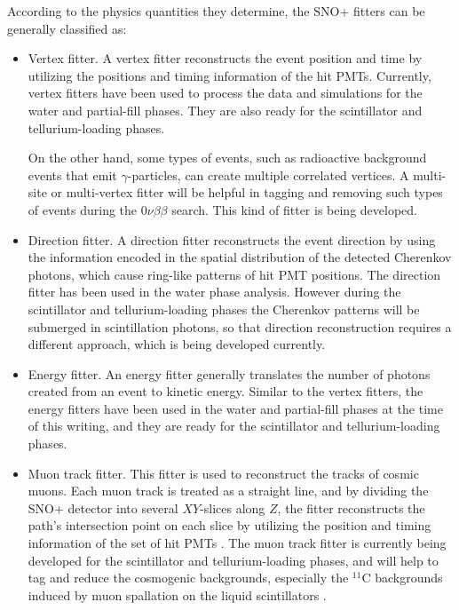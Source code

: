 According to the physics quantities they determine, the SNO+ fitters can be generally classified as:
\begin{itemize}
	\item Vertex fitter. A vertex fitter reconstructs the event position and time by utilizing the positions and timing information of the hit PMTs. Currently, vertex fitters have been used to process the data and simulations for the water and partial-fill phases. They are also ready for the scintillator and tellurium-loading phases.
	
    On the other hand, some types of events, such as radioactive background events that emit $\gamma$-particles, can create multiple correlated vertices. A multi-site or multi-vertex fitter will be helpful in tagging and removing such types of events during the $0\nu\beta\beta$ search. This kind of fitter is being developed.

	\item Direction fitter. A direction fitter reconstructs the event direction by using the information encoded in the spatial distribution of the detected Cherenkov photons, which cause ring-like patterns of hit PMT positions. The direction fitter has been used in the water phase analysis. However during the scintillator and tellurium-loading phases the Cherenkov patterns will be submerged in scintillation photons, so that direction reconstruction requires a different approach, which is being developed currently. 
	
	\item Energy fitter. An energy fitter generally translates the number of photons created from an event to kinetic energy. Similar to the vertex fitters, the energy fitters have been used in the water and partial-fill phases at the time of this writing, and they are ready for the scintillator and tellurium-loading phases.

	\item Muon track fitter. This fitter is used to reconstruct the tracks of cosmic muons. Each muon track is treated as a straight line, and by dividing the SNO+ detector into several $XY$-slices along $Z$, the fitter reconstructs the path's intersection point on each slice by utilizing the position and timing information of the set of hit PMTs \cite{muonTrackRecon}. The muon track fitter is currently being developed for the scintillator and tellurium-loading phases, and will help to tag and reduce the cosmogenic backgrounds, especially the $^{11}$C backgrounds induced by muon spallation on the liquid scintillators \cite{sorensen2016temperature}.
\end{itemize}

